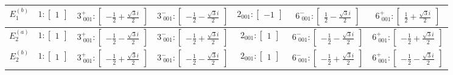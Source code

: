 \documentclass[fleqn,8pt,landscape]{jsarticle}
\begin{document}
\begin{longtable}{ccccccc}
$ E_{1}^{(b)} $ & $ 1:\begin{bmatrix} 1 \end{bmatrix} $ & $ 3^{+}_{\,\,001}:\begin{bmatrix} - \frac{1}{2} + \frac{\sqrt{3} i}{2} \end{bmatrix} $ & $ 3^{-}_{\,\,001}:\begin{bmatrix} - \frac{1}{2} - \frac{\sqrt{3} i}{2} \end{bmatrix} $ & $ 2{}_{001}:\begin{bmatrix} -1 \end{bmatrix} $ & $ 6^{-}_{\,\,001}:\begin{bmatrix} \frac{1}{2} - \frac{\sqrt{3} i}{2} \end{bmatrix} $ & $ 6^{+}_{\,\,001}:\begin{bmatrix} \frac{1}{2} + \frac{\sqrt{3} i}{2} \end{bmatrix} $ \\ \hline
$ E_{2}^{(a)} $ & $ 1:\begin{bmatrix} 1 \end{bmatrix} $ & $ 3^{+}_{\,\,001}:\begin{bmatrix} - \frac{1}{2} - \frac{\sqrt{3} i}{2} \end{bmatrix} $ & $ 3^{-}_{\,\,001}:\begin{bmatrix} - \frac{1}{2} + \frac{\sqrt{3} i}{2} \end{bmatrix} $ & $ 2{}_{001}:\begin{bmatrix} 1 \end{bmatrix} $ & $ 6^{-}_{\,\,001}:\begin{bmatrix} - \frac{1}{2} - \frac{\sqrt{3} i}{2} \end{bmatrix} $ & $ 6^{+}_{\,\,001}:\begin{bmatrix} - \frac{1}{2} + \frac{\sqrt{3} i}{2} \end{bmatrix} $ \\ \hline
$ E_{2}^{(b)} $ & $ 1:\begin{bmatrix} 1 \end{bmatrix} $ & $ 3^{+}_{\,\,001}:\begin{bmatrix} - \frac{1}{2} + \frac{\sqrt{3} i}{2} \end{bmatrix} $ & $ 3^{-}_{\,\,001}:\begin{bmatrix} - \frac{1}{2} - \frac{\sqrt{3} i}{2} \end{bmatrix} $ & $ 2{}_{001}:\begin{bmatrix} 1 \end{bmatrix} $ & $ 6^{-}_{\,\,001}:\begin{bmatrix} - \frac{1}{2} + \frac{\sqrt{3} i}{2} \end{bmatrix} $ & $ 6^{+}_{\,\,001}:\begin{bmatrix} - \frac{1}{2} - \frac{\sqrt{3} i}{2} \end{bmatrix} $ \\
\end{longtable}
\end{document}
